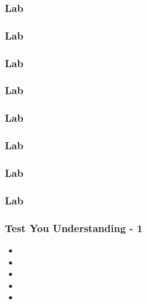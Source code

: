 \documentclass[t, notes, xcolor=table]{beamer}
\begin{document}
\begin{frame}
\frametitle{Lab}

\end{frame}
\note{
\scriptsize{

}
}

\begin{frame}
\frametitle{Lab}

\end{frame}
\note{
\scriptsize{

}
}

\begin{frame}
\frametitle{Lab}

\end{frame}
\note{
\scriptsize{

}
}

\begin{frame}
\frametitle{Lab}

\end{frame}
\note{
\scriptsize{

}
}

\begin{frame}
\frametitle{Lab}

\end{frame}
\note{
\scriptsize{

}
}

\begin{frame}
\frametitle{Lab}

\end{frame}
\note{
\scriptsize{

}
}

\begin{frame}
\frametitle{Lab}

\end{frame}
\note{
\scriptsize{

}
}

\begin{frame}
\frametitle{Lab}

\end{frame}
\note{
\scriptsize{

}
}



\begin{frame}
\frametitle{Test You Understanding - 1}

\begin{itemize}
\item[$\square$] 
\item[$\square$] 
\item[$\square$] 
\item[$\square$] 
\item[$\square$] 
\end{itemize}
\end{frame}
\note{
\scriptsize{

}
}
\end{document}
